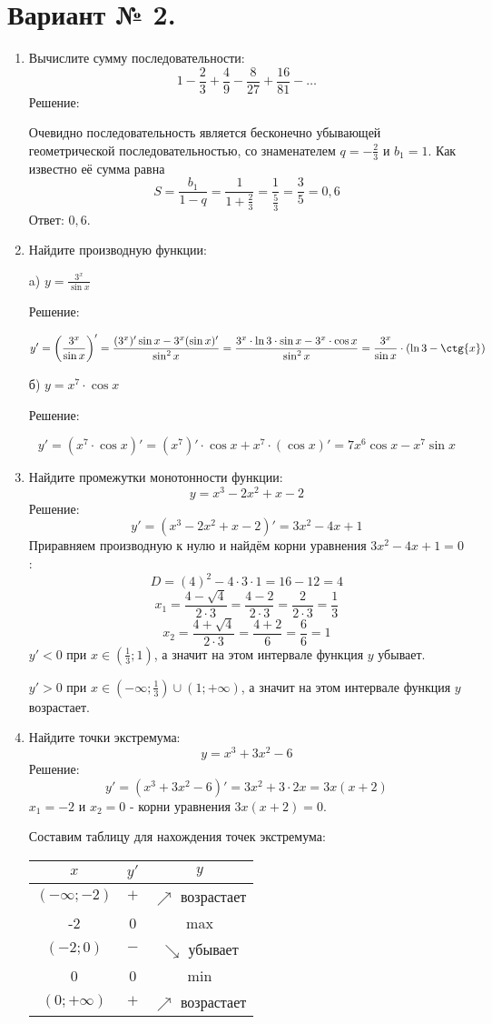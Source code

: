 \documentclass{article}
\begin{document}
\section*{Вариант № 2.}
\begin{enumerate}

\item %
Вычислите сумму последовательности:
$$1-\frac{2}{3}+\frac{4}{9}-\frac{8}{27}+\frac{16}{81}-\ldots$$
Решение:

Очевидно последовательность является бесконечно убывающей геометрической последовательностью, со знаменателем $q=-\frac{2}{3}$ и $b_1=1$. Как известно её сумма равна $$S=\frac{b_1}{1-q}=\frac{1}{1+\frac{2}{3}}=\frac{1}{\frac{5}{3}}=\frac{3}{5}=0,6$$
Ответ: $0,6$.
\item %
Найдите производную функции:

a) $y=\frac{3^x}{\sin{x}}$

Решение:

$$y'=\left(\frac{3^x}{\sin{x}}\right)'=\frac{(3^x)'\sin{x}-3^x(\sin{x})'}{\sin^2{x}}=\frac{3^x\cdot\ln{3}\cdot\sin{x}-3^x\cdot\cos{x}}{\sin^2{x}}=\frac{3^x}{\sin{x}}\cdot(\ln{3}-\ctg{x})$$

б) $y=x^{7}\cdot\cos{x}$

Решение:

$$y'=\left(x^7\cdot\cos{x}\right)'=(x^7)'\cdot\cos{x}+x^7\cdot(\cos{x})'=7x^6\cos{x}-x^7\sin{x}$$

\item %
Найдите промежутки монотонности функции:
$$y=x^3-2x^2+x-2$$
Решение:
$$y'=\left(x^3-2x^2+x-2\right)'=3x^2-4x+1$$
Приравняем производную к нулю и найдём корни уравнения $3x^2-4x+1=0$:
$$D=(4)^2-4\cdot3\cdot1=16-12=4$$
$$x_1=\frac{4-\sqrt{4}}{2\cdot3}=\frac{4-2}{2\cdot3}=\frac{2}{2\cdot3}=\frac{1}{3}$$
$$x_2=\frac{4+\sqrt{4}}{2\cdot3}=\frac{4+2}{6}=\frac{6}{6}=1$$
$y'<0$ при $x\in\left(\frac{1}{3};1\right)$, а значит на этом интервале функция $y$ убывает.

$y'>0$ при $x\in\left(-\infty;\frac{1}{3}\right)\cup\left(1;+\infty\right)$, а значит на этом интервале функция $y$ возрастает.
\item %
Найдите точки экстремума:
$$y=x^3+3x^2-6$$
Решение:
$$y'=\left(x^3+3x^2-6\right)'=3x^2+3\cdot2x=3x(x+2)$$
$x_1=-2$ и $x_2=0$ - корни уравнения $3x(x+2)=0$.

Составим таблицу для нахождения точек экстремума:

\begin{center}
\begin{tabular}{|c|c|c|}
\hline
$x$ & $y'$ & $y$ \\
\hline\hline
$\left(-\infty;-2\right)$ & $+$ & $\nearrow$ возрастает \\
\hline
-2 & 0 & max\\
\hline
$\left(-2;0\right)$ & $-$ & $\searrow$ убывает\\
\hline
0 & 0 & min \\
\hline
$\left(0;+\infty\right)$ & $+$ & $\nearrow$ возрастает \\
\hline
\end{tabular}
\end{center}


\end{enumerate}
\end{document}
